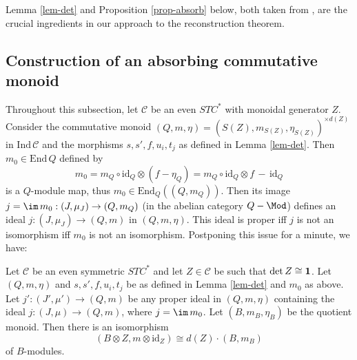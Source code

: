 \documentclass[12pt]{article}
\theoremstyle{definition}
\theoremstyle{definition}
\theoremstyle{remark}
\def\2#1{{\mathcal #1}}
\def\1#1{{\bf #1}}
\newcommand{\End}{\mathrm{End}}
\newcommand{\mcirc}{\circ}
\newcommand{\rarr}{\rightarrow}
\def\id{\mathrm{id}}
\begin{document}
\brem Lemma \ref{lem-det} and Proposition \ref{prop-absorb} below, both taken from \cite{bichon},
are the crucial ingredients in our approach to the reconstruction theorem.
\erem





\subsection{Construction of an absorbing commutative monoid} \label{ss-monoid2}
Throughout this subsection, let $\2C$ be an even $STC^*$ with monoidal generator $Z$. Consider the
commutative monoid $(Q,m,\eta)=(S(Z),m_{S(Z)},\eta_{S(Z)})^{\times d(Z)}$ in $\mathrm{Ind}\,\2C$ and
the morphisms $s,s',f,u_i,t_j$ as defined in Lemma \ref{lem-det}. Then $m_0\in\End\,Q$ defined by 
\[  m_0 = m_Q\mcirc\id_Q\otimes (f-\eta_Q)=m_Q\mcirc\id_Q\otimes f \,-\, \id_Q \]
is a $Q$-module map, thus $m_0\in\End_Q((Q,m_Q))$. Then its image 
$j=\im\,m_0:(J,\mu_J)\rarr(Q,m_Q)$ (in the abelian category $Q-\Mod$) defines 
an ideal $j:(J,\mu_J)\rarr(Q,m)$ in $(Q,m,\eta)$. This ideal is proper iff $j$ is not an
isomorphism iff $m_0$ is not an isomorphism. Postponing this issue for a minute, we have:

\bprop \label{prop-absorb} 
Let $\2C$ be an even symmetric $STC^*$ and let $Z\in\2C$ be such that $\det Z\cong\11$. Let
$(Q,m,\eta)$ and $s,s',f,u_i,t_j$ be as defined in Lemma \ref{lem-det} and $m_0$ as above. Let
$j':(J',\mu')\rarr(Q,m)$ be any proper ideal in $(Q,m,\eta)$ containing the ideal
$j:(J,\mu)\rarr(Q,m)$, where $j=\im\,m_0$. Let $(B,m_B,\eta_B)$ be the quotient monoid. Then
there is an  isomorphism 
\[ (B\otimes Z,m\otimes\id_Z)\cong d(Z)\cdot(B,m_B) \]
of $B$-modules. 
\eprop
\end{document}
